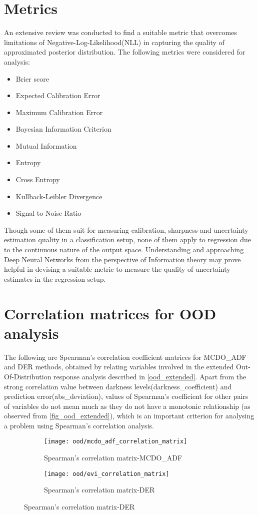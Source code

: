 

    \chapter{Metrics}
    An extensive review was conducted to find a suitable metric that overcomes limitations of Negative-Log-Likelihood(NLL) in capturing the quality of approximated posterior distribution. The following metrics were considered for analysis:
    \begin{itemize}
	\item Brier score
	\item Expected Calibration Error
	\item Maximum Calibration Error
	\item Bayesian Information Criterion
	\item Mutual Information
	\item Entropy
	\item Cross Entropy
	\item Kullback-Leibler Divergence
	\item Signal to Noise Ratio
    \end{itemize}
	Though some of them suit for measuring calibration, sharpness and uncertainty estimation quality in a classification setup, none of them apply to regression due to the continuous nature of the output space. Understanding and approaching Deep Neural Networks from the perspective of Information theory\cite{saxe2019on} may prove helpful in devising a suitable metric to measure the quality of uncertainty estimates in the regression setup.
	\chapter{Correlation matrices for OOD analysis}
	The following are Spearman's correlation coefficient matrices for MCDO\_ADF and DER methods, obtained by relating variables involved in the extended Out-Of-Distribution response analysis described in \ref{ood_extended}. Apart from the strong correlation value between darkness levels(darkness\_coefficient) and prediction error(abs\_deviation), values of Spearman's coefficient for other pairs of variables do not mean much as they do not have a monotonic relationship (as observed from \ref{fig_ood_extended}), which is an important criterion for analysing a problem using Spearman's correlation analysis.
	\begin{figure}[H]
	\begin{subfigure}[b]{0.5\textwidth}
	\texttt{[image: ood/mcdo\_adf\_correlation\_matrix]}
	\caption{Spearman's correlation matrix-MCDO\_ADF}
	\label{homo_fn1}
	\end{subfigure}
	\hfill
	\begin{subfigure}[b]{0.5\textwidth}
	\texttt{[image: ood/evi\_correlation\_matrix]}
	\caption{Spearman's correlation matrix-DER}
	\label{hetero_fn1}
	\end{subfigure}
	\hfill
	\end{figure}

